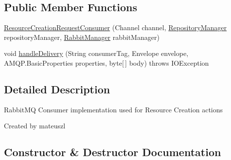 \subsection*{Public Member Functions}
\begin{DoxyCompactItemize}
\item 
\hyperlink{classeu_1_1h2020_1_1symbiote_1_1messaging_1_1ResourceCreationRequestConsumer_ad02c4274f1fa39b858e7c68120704e94}{Resource\+Creation\+Request\+Consumer} (Channel channel, \hyperlink{classeu_1_1h2020_1_1symbiote_1_1repository_1_1RepositoryManager}{Repository\+Manager} repository\+Manager, \hyperlink{classeu_1_1h2020_1_1symbiote_1_1messaging_1_1RabbitManager}{Rabbit\+Manager} rabbit\+Manager)
\item 
void \hyperlink{classeu_1_1h2020_1_1symbiote_1_1messaging_1_1ResourceCreationRequestConsumer_ac2192f2c6e6d644dc1ba1ca91a2fbb3c}{handle\+Delivery} (String consumer\+Tag, Envelope envelope, A\+M\+Q\+P.\+Basic\+Properties properties, byte\mbox{[}$\,$\mbox{]} body)  throws I\+O\+Exception 
\end{DoxyCompactItemize}


\subsection{Detailed Description}
Rabbit\+MQ Consumer implementation used for Resource Creation actions

Created by mateuszl 

\subsection{Constructor \& Destructor Documentation}
